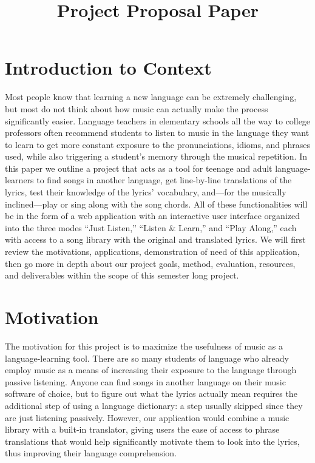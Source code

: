 \documentclass[conference, 12pt]{IEEEtran}
\begin{document}

\title{Project Proposal Paper}

\author{
    \and
    \and
}

\maketitle

\section{Introduction to Context}
Most people know that learning a new language can be extremely challenging, but most do not think about how music can actually make the process significantly easier.
Language teachers in elementary schools all the way to college professors often recommend students to listen to music in the language they want to learn to get more constant exposure to the pronunciations, idioms, and phrases used, while also triggering a student's memory through the musical repetition.
In this paper we outline a project that acts as a tool for teenage and adult language-learners to find songs in another language, get line-by-line translations of the lyrics, test their knowledge of the lyrics' vocabulary, and—for the musically inclined—play or sing along with the song chords.
All of these functionalities will be in the form of a web application with an interactive user interface organized into the three modes ``Just Listen,'' ``Listen \& Learn,'' and ``Play Along,'' each with access to a song library with the original and translated lyrics.
We will first review the motivations, applications, demonstration of need of this application, then go more in depth about our project goals, method, evaluation, resources, and deliverables within the scope of this semester long project.

\section{Motivation}
The motivation for this project is to maximize the usefulness of music as a language-learning tool. 
There are so many students of language who already employ music as a means of increasing their exposure to the language through passive listening.
Anyone can find songs in another language on their music software of choice, but to figure out what the lyrics actually mean requires the additional step of using a language dictionary: a step usually skipped since they are just listening passively. 
However, our application would combine a music library with a built-in translator, giving users the ease of access to phrase translations that would help significantly motivate them to look into the lyrics, thus improving their language comprehension.
\end{document}

